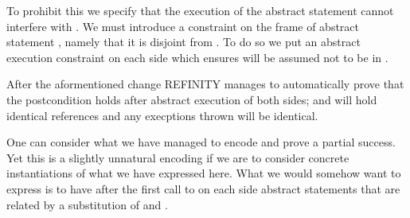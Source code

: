To prohibit this we specify that the execution of the abstract statement  cannot interfere with .
We must introduce a constraint on the frame  of abstract statement , namely that it is disjoint from .
To do so we put an abstract execution constraint  on each side which ensures 
will be assumed not to be in .

After the aformentioned change REFINITY manages to automatically prove that the postcondition holds after abstract execution of both sides;
 and  will hold identical references and any execptions thrown will be identical.

One can consider what we have managed to encode and prove a partial success.
Yet this is a slightly unnatural encoding if we are to consider concrete instantiations of what we have expressed here.
What we would somehow want to express is to have after the first call to  on each side abstract statements that are related by a substitution of  and .

